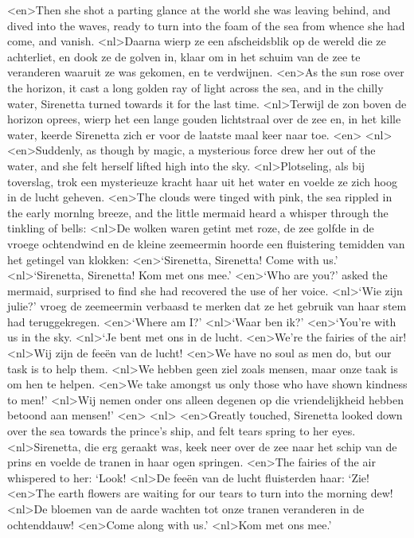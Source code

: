 <en>Then she shot a parting glance at the world she was leaving behind, and dived into the waves, ready to turn into the foam of the sea from whence she had come, and vanish.
<nl>Daarna wierp ze een afscheidsblik op de wereld die ze achterliet, en dook ze de golven in, klaar om in het schuim van de zee te veranderen waaruit ze was gekomen, en te verdwijnen.
<en>As the sun rose over the horizon, it cast a long golden ray of light across the sea, and in the chilly water, Sirenetta turned towards it for the last time.
<nl>Terwijl de zon boven de horizon oprees, wierp het een lange gouden lichtstraal over de zee en, in het kille water, keerde Sirenetta zich er voor de laatste maal keer naar toe.
<en>
<nl>
<en>Suddenly, as though by magic, a mysterious force drew her out of the water, and she felt herself lifted high into the sky.
<nl>Plotseling, als bij toverslag, trok een mysterieuze kracht haar uit het water en voelde ze zich hoog in de lucht geheven.
<en>The clouds were tinged with pink, the sea rippled in the early mornlng breeze, and the little mermaid heard a whisper through the tinkling of bells: 
<nl>De wolken waren getint met roze, de zee golfde in de vroege ochtendwind en de kleine zeemeermin hoorde een fluistering temidden van het getingel van klokken: 
<en>`Sirenetta, Sirenetta! Come with us.'
<nl>`Sirenetta, Sirenetta! Kom met ons mee.'
<en>`Who are you?' asked the mermaid, surprised to find she had recovered the use of her voice.
<nl>`Wie zijn julie?' vroeg de zeemeermin verbaasd te merken dat ze het gebruik van haar stem had teruggekregen.
<en>`Where am I?'
<nl>`Waar ben ik?'
<en>`You’re with us in the sky.
<nl>`Je bent met ons in de lucht.
<en>We’re the fairies of the air!
<nl>Wij zijn de feeën van de lucht!
<en>We have no soul as men do, but our task is to help them.
<nl>We hebben geen ziel zoals mensen, maar onze taak is om hen te helpen.
<en>We take amongst us only those who have shown kindness to men!'
<nl>Wij nemen onder ons alleen degenen op die vriendelijkheid hebben betoond aan mensen!'
<en>
<nl>
<en>Greatly touched, Sirenetta looked down over the sea towards the prince’s ship, and felt tears spring to her eyes.
<nl>Sirenetta, die erg geraakt was, keek neer over de zee naar het schip van de prins en voelde de tranen in haar ogen springen.
<en>The fairies of the air whispered to her: `Look!
<nl>De feeën van de lucht fluisterden haar: `Zie!
<en>The earth flowers are waiting for our tears to turn into the morning dew!
<nl>De bloemen van de aarde wachten tot onze tranen veranderen in de ochtenddauw!
<en>Come along with us.'
<nl>Kom met ons mee.'

